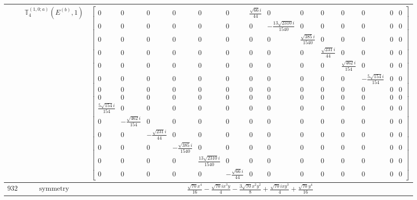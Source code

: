 \documentclass[fleqn,8pt,landscape]{jsarticle}
\begin{document}
\begin{longtable}{ccc}
$  $ & $ \mathbb{T}_{4}^{(1,0;a)}(E^{(b)},1) $ & $ \begin{bmatrix} 0 & 0 & 0 & 0 & 0 & 0 & \frac{\sqrt{66} i}{44} & 0 & 0 & 0 & 0 & 0 & 0 & 0 \\ 0 & 0 & 0 & 0 & 0 & 0 & 0 & - \frac{13 \sqrt{2310} i}{1540} & 0 & 0 & 0 & 0 & 0 & 0 \\ 0 & 0 & 0 & 0 & 0 & 0 & 0 & 0 & \frac{\sqrt{385} i}{1540} & 0 & 0 & 0 & 0 & 0 \\ 0 & 0 & 0 & 0 & 0 & 0 & 0 & 0 & 0 & \frac{\sqrt{231} i}{44} & 0 & 0 & 0 & 0 \\ 0 & 0 & 0 & 0 & 0 & 0 & 0 & 0 & 0 & 0 & \frac{\sqrt{462} i}{154} & 0 & 0 & 0 \\ 0 & 0 & 0 & 0 & 0 & 0 & 0 & 0 & 0 & 0 & 0 & - \frac{5 \sqrt{154} i}{154} & 0 & 0 \\ 0 & 0 & 0 & 0 & 0 & 0 & 0 & 0 & 0 & 0 & 0 & 0 & 0 & 0 \\ 0 & 0 & 0 & 0 & 0 & 0 & 0 & 0 & 0 & 0 & 0 & 0 & 0 & 0 \\ \frac{5 \sqrt{154} i}{154} & 0 & 0 & 0 & 0 & 0 & 0 & 0 & 0 & 0 & 0 & 0 & 0 & 0 \\ 0 & - \frac{\sqrt{462} i}{154} & 0 & 0 & 0 & 0 & 0 & 0 & 0 & 0 & 0 & 0 & 0 & 0 \\ 0 & 0 & - \frac{\sqrt{231} i}{44} & 0 & 0 & 0 & 0 & 0 & 0 & 0 & 0 & 0 & 0 & 0 \\ 0 & 0 & 0 & - \frac{\sqrt{385} i}{1540} & 0 & 0 & 0 & 0 & 0 & 0 & 0 & 0 & 0 & 0 \\ 0 & 0 & 0 & 0 & \frac{13 \sqrt{2310} i}{1540} & 0 & 0 & 0 & 0 & 0 & 0 & 0 & 0 & 0 \\ 0 & 0 & 0 & 0 & 0 & - \frac{\sqrt{66} i}{44} & 0 & 0 & 0 & 0 & 0 & 0 & 0 & 0 \end{bmatrix} $ \\ \hline
$ 932 $ & $ \text{symmetry} $ & $ \frac{\sqrt{70} x^{4}}{16} - \frac{\sqrt{70} i x^{3} y}{4} - \frac{3 \sqrt{70} x^{2} y^{2}}{8} + \frac{\sqrt{70} i x y^{3}}{4} + \frac{\sqrt{70} y^{4}}{16} $ \\

\end{longtable}
\end{document}
